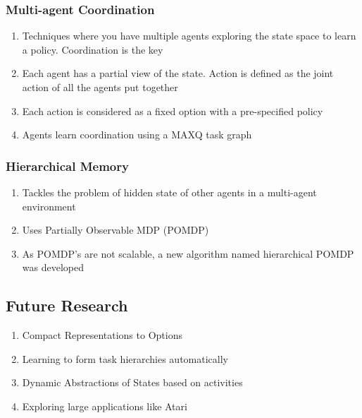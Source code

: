 \subsubsection{Multi-agent Coordination}
\begin{enumerate}
\item[] Techniques where you have multiple agents exploring the state space to learn a policy. Coordination is the key
\item[] Each agent has a partial view of the state. Action is defined as the joint action of all the agents put together
\item[] Each action is considered as a fixed option with a pre-specified policy
\item[] Agents learn coordination using a MAXQ task graph
\end{enumerate}

\subsubsection{Hierarchical Memory}
\begin{enumerate}
\item[] Tackles the problem of hidden state of other agents in a multi-agent environment
\item[] Uses Partially Observable MDP (POMDP)
\item[] As POMDP’s are not scalable, a new algorithm named hierarchical POMDP was developed
\end{enumerate}


\subsection{Future Research}
\begin{enumerate}
\item[] Compact Representations to Options
\item[] Learning to form task hierarchies automatically
\item[] Dynamic Abstractions of States based on activities
\item[] Exploring large applications like Atari 
\end{enumerate}